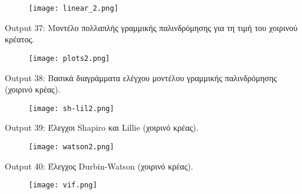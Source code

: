 \documentclass[10pt]{article}
\begin{document}
\begin{figure}[H]
    \centering
    \texttt{[image: linear\_2.png]}
    
    \label{fig:galaxy}
\end{figure}

\begin{centering}


\renewcommand{\caption}{Output 37: }
\caption { Μοντέλο πολλαπλής γραμμικής παλινδρόμησης για τη τιμή του χοιρινού κρέατος. }
\end{centering}


\begin{figure}[H]
    \centering
    \texttt{[image: plots2.png]}
    
    \label{fig:galaxy}
\end{figure}

\begin{centering}


\renewcommand{\caption}{Output 38: }
\caption {  Βασικά διαγράμματα ελέγχου μοντέλου γραμμικής παλινδρόμησης (χοιρινό κρέας). }
\end{centering}

 \begin{figure}[H]
    \centering
    \texttt{[image: sh-lil2.png]}
    
    \label{fig:galaxy}
\end{figure}

\begin{centering}


\renewcommand{\caption}{Output 39: }
\caption {  Έλεγχοι Shapiro και Lillie (χοιρινό κρέας). }
\end{centering}

 \begin{figure}[H]
    \centering
    \texttt{[image: watson2.png]}
    
    \label{fig:galaxy}
\end{figure}

\begin{centering}


\renewcommand{\caption}{Output 40: }
\caption {  Έλεγχος Durbin-Watson (χοιρινό κρέας). }
\end{centering}

 \begin{figure}[H]
    \centering
    \texttt{[image: vif.png]}
    
    \label{fig:galaxy}
\end{figure}
\end{document}
